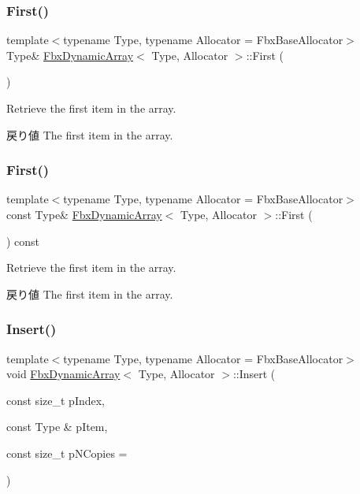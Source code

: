 \subsubsection{\texorpdfstring{First()}{First()}\hspace{0.1cm}{\footnotesize\ttfamily [1/2]}}
{\footnotesize\ttfamily template$<$typename Type, typename Allocator = Fbx\+Base\+Allocator$>$ \\
Type\& \hyperlink{class_fbx_dynamic_array}{Fbx\+Dynamic\+Array}$<$ Type, Allocator $>$\+::First (\begin{DoxyParamCaption}{ }\end{DoxyParamCaption})}

Retrieve the first item in the array. \begin{DoxyReturn}{戻り値}
The first item in the array. 
\end{DoxyReturn}
\mbox{\label{class_fbx_dynamic_array_ac7cc372d97cb5004e393cbadbd613249}} 
\subsubsection{\texorpdfstring{First()}{First()}\hspace{0.1cm}{\footnotesize\ttfamily [2/2]}}
{\footnotesize\ttfamily template$<$typename Type, typename Allocator = Fbx\+Base\+Allocator$>$ \\
const Type\& \hyperlink{class_fbx_dynamic_array}{Fbx\+Dynamic\+Array}$<$ Type, Allocator $>$\+::First (\begin{DoxyParamCaption}{ }\end{DoxyParamCaption}) const}

Retrieve the first item in the array. \begin{DoxyReturn}{戻り値}
The first item in the array. 
\end{DoxyReturn}
\mbox{\label{class_fbx_dynamic_array_aee7c781eb7382754473b618e766a601f}} 
\subsubsection{\texorpdfstring{Insert()}{Insert()}}
{\footnotesize\ttfamily template$<$typename Type, typename Allocator = Fbx\+Base\+Allocator$>$ \\
void \hyperlink{class_fbx_dynamic_array}{Fbx\+Dynamic\+Array}$<$ Type, Allocator $>$\+::Insert (\begin{DoxyParamCaption}\item[{const size\+\_\+t}]{p\+Index,  }\item[{const Type \&}]{p\+Item,  }\item[{const size\+\_\+t}]{p\+N\+Copies = {} }\end{DoxyParamCaption})}

